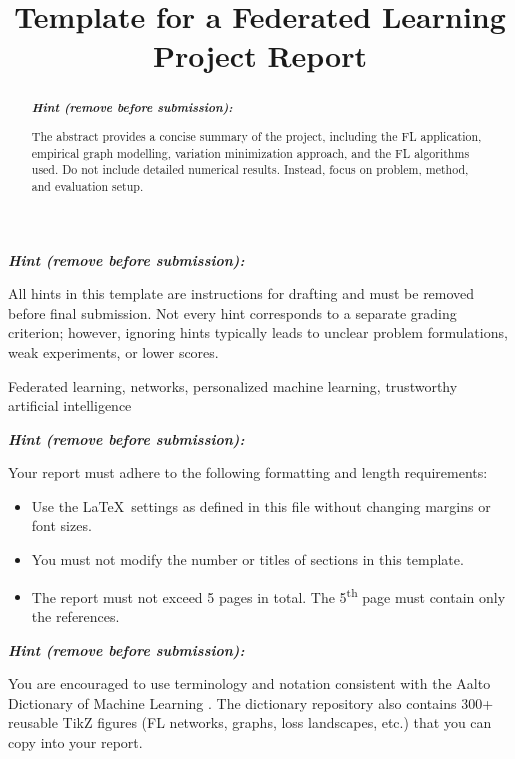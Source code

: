 \documentclass{article}
\title{Template for a Federated Learning Project Report}
\newenvironment{hint}{%
	\par\medskip\noindent
	\begin{minipage}[t]{\dimexpr\columnwidth-8mm}%
	\raggedright\itshape
	\textbf{Hint (remove before submission):}\space
}{%
	\end{minipage}\par\medskip
}
\begin{document}
\maketitle

\begin{hint}
	All hints in this template are instructions for drafting and must be
	removed before final submission. Not every hint corresponds to a
	separate grading criterion; however, ignoring hints typically leads to unclear
	problem formulations, weak experiments, or lower scores.
\end{hint}

\begin{abstract}
	\begin{hint}
The abstract provides a concise summary of the project, including the FL application,
empirical graph modelling, variation minimization approach, and the FL algorithms used.
Do not include detailed numerical results. Instead, focus on problem, method, and evaluation setup.
	\end{hint}
\end{abstract}

\begin{keywords}
Federated learning, networks, personalized machine learning, trustworthy artificial intelligence
\end{keywords}

\begin{hint}
	Your report must adhere to the following formatting and length requirements:
\begin{itemize}
	\item Use the \LaTeX\ settings as defined in this file without changing margins or font sizes.
	\item You must not modify the number or titles of sections in this template.
	\item The report must not exceed 5 pages in total. The 5\textsuperscript{th} page must
	contain only the references.
\end{itemize}
\end{hint}

\begin{hint}
You are encouraged to use terminology and notation consistent with the
Aalto Dictionary of Machine Learning \cite{AaltoDictML}.
The dictionary repository also contains 300+ reusable TikZ figures
(FL networks, graphs, loss landscapes, etc.) that you can copy into your report.
\end{hint}
\end{document}
